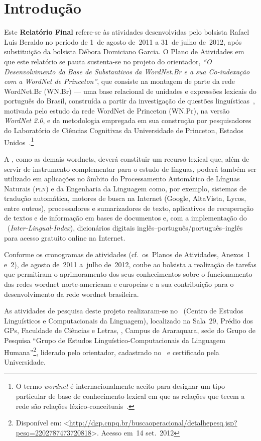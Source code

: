 \chapter{Introdução}

Este \textbf{Relatório Final} refere-se às atividades desenvolvidas pelo
bolsista Rafael Luis Beraldo no período de 1\textordmasculine~de agosto de~2011
a 31~de julho de~2012, após substituição da bolsista Débora Domiciano Garcia. O
Plano de Atividades em que este relatório se pauta sustenta-se no projeto do
orientador, \textit{``O Desenvolvimento da Base de Substantivos da WordNet.Br e
a sua Co-indexação com a WordNet de Princeton''}, que consiste na montagem de
parte da rede WordNet.Br (WN.Br) --- uma base relacional de unidades e
expressões lexicais do português do Brasil, construída a partir da investigação
de questões linguísticas~\cite{bentoetal,bento}, motivada pelo estudo da rede
WordNet de Princeton (WN.Pr), na versão \textit{WordNet 2.0}, e da metodologia
empregada em sua construção por pesquisadores do Laboratório de Ciências
Cognitivas da Universidade de Princeton, Estados
Unidos~\cite{miller,fellbaum}.\footnote{O termo \textit{wordnet} é
internacionalmente aceito para designar um tipo particular de base de
conhecimento lexical em que as relações que tecem a rede são relações
léxico-conceituais~\cite{marrafa}.} 

A \wnbr, como as demais wordnets, deverá constituir um recurso lexical que,
além de servir de instrumento complementar para o estudo de línguas, poderá
também ser utilizado em aplicações no âmbito do Processamento Automático de
Línguas Naturais (\textsc{pln}) e da Engenharia da Linguagem como, por exemplo,
sistemas de tradução automática, motores de busca na Internet (Google,
AltaVista, Lycos, entre outros), processadores e sumarizadores de texto,
aplicativos de recuperação de textos e de informação em bases de documentos e,
com a implementação do
\ili~(\foreignlanguage{english}{\textit{Inter-Lingual-Index}}), dicionários
digitais inglês--português/português--inglês para acesso gratuito online na
Internet.

Conforme os cronogramas de atividades (cf.~os~Planos de Atividades, Anexos~1
e~2), de agosto de~2011 a~julho de~2012, coube ao bolsista a realização de
tarefas que permitiram o aprimoramento dos seus conhecimentos sobre o
funcionamento das redes wordnet norte-americana e europeias e a sua
contribuição para o desenvolvimento da rede wordnet brasileira.

As atividades de pesquisa deste projeto realizaram-se no \celic\ (Centro de
Estudos Linguísticos e Computacionais da Linguagem), localizado na Sala~29,
Prédio dos GPs, Faculdade de Ciências e Letras, \unesp, Campus de Araraquara,
sede do Grupo de Pesquisa ``Grupo de Estudos Linguístico-Computacionais da
Linguagem Humana''\footnote{Disponível em:
<\url{http://dgp.cnpq.br/buscaoperacional/detalhepesq.jsp?pesq=2202787473720818}>.
Acesso em~14 set.~2012}, liderado pelo orientador, cadastrado no \cnpq\ e
certificado pela Universidade.

